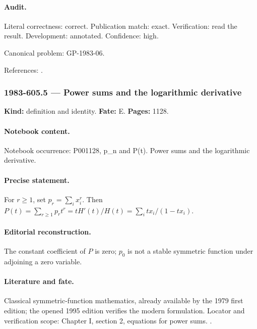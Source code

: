 \paragraph{Audit.} Literal correctness: correct. Publication match: exact. Verification: read the result. Development: annotated. Confidence: high.

\noindent Canonical problem: GP-1983-06.\par

\noindent References: \citep{macdonald1995symmetric}.\par

\subsubsection{1983-605.5 --- Power sums and the logarithmic derivative}

\label{item:1983-605.5}

\noindent\textbf{Kind:} definition and identity. \textbf{Fate:} E. \textbf{Pages:} 1128.\par

\paragraph{Notebook content.} Notebook occurrence: P001128, p_n and P(t). Power sums and the logarithmic derivative.

\paragraph{Precise statement.} For \(r\ge1\), set \(p_r=\sum_i x_i^r\). Then \(P(t)=\sum_{r\ge1}p_rt^r=tH'(t)/H(t)=\sum_i tx_i/(1-tx_i)\).

\paragraph{Editorial reconstruction.} The constant coefficient of \(P\) is zero; \(p_0\) is not a stable symmetric function under adjoining a zero variable.

\paragraph{Literature and fate.} Classical symmetric-function mathematics, already available by the 1979 first edition; the opened 1995 edition verifies the modern formulation. Locator and verification scope: Chapter I, section 2, equations for power sums. \cite{macdonald1995symmetric}.

